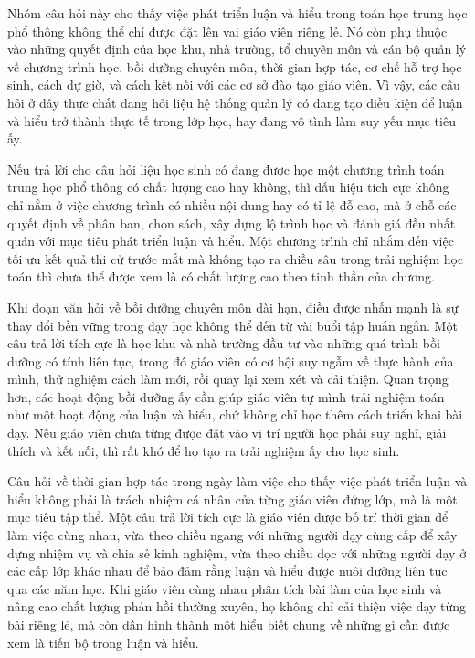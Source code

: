 \documentclass[
  10pt,
  a4paper,
  landscape,
  twoside,
  openany
]{scrbook}
\newcommand{\NOTE}[1]{#1}
\begin{document}
{
\NOTE{Nhóm câu hỏi này cho thấy việc phát triển luận và hiểu trong toán học trung học phổ thông không thể chỉ được đặt lên vai giáo viên riêng lẻ. Nó còn phụ thuộc vào những quyết định của học khu, nhà trường, tổ chuyên môn và cán bộ quản lý về chương trình học, bồi dưỡng chuyên môn, thời gian hợp tác, cơ chế hỗ trợ học sinh, cách dự giờ, và cách kết nối với các cơ sở đào tạo giáo viên. Vì vậy, các câu hỏi ở đây thực chất đang hỏi liệu hệ thống quản lý có đang tạo điều kiện để luận và hiểu trở thành thực tế trong lớp học, hay đang vô tình làm suy yếu mục tiêu ấy.

Nếu trả lời cho câu hỏi liệu học sinh có đang được học một chương trình toán trung học phổ thông có chất lượng cao hay không, thì dấu hiệu tích cực không chỉ nằm ở việc chương trình có nhiều nội dung hay có tỉ lệ đỗ cao, mà ở chỗ các quyết định về phân ban, chọn sách, xây dựng lộ trình học và đánh giá đều nhất quán với mục tiêu phát triển luận và hiểu. Một chương trình chỉ nhắm đến việc tối ưu kết quả thi cử trước mắt mà không tạo ra chiều sâu trong trải nghiệm học toán thì chưa thể được xem là có chất lượng cao theo tinh thần của chương.

Khi đoạn văn hỏi về bồi dưỡng chuyên môn dài hạn, điều được nhấn mạnh là sự thay đổi bền vững trong dạy học không thể đến từ vài buổi tập huấn ngắn. Một câu trả lời tích cực là học khu và nhà trường đầu tư vào những quá trình bồi dưỡng có tính liên tục, trong đó giáo viên có cơ hội suy ngẫm về thực hành của mình, thử nghiệm cách làm mới, rồi quay lại xem xét và cải thiện. Quan trọng hơn, các hoạt động bồi dưỡng ấy cần giúp giáo viên tự mình trải nghiệm toán như một hoạt động của luận và hiểu, chứ không chỉ học thêm cách triển khai bài dạy. Nếu giáo viên chưa từng được đặt vào vị trí người học phải suy nghĩ, giải thích và kết nối, thì rất khó để họ tạo ra trải nghiệm ấy cho học sinh.

Câu hỏi về thời gian hợp tác trong ngày làm việc cho thấy việc phát triển luận và hiểu không phải là trách nhiệm cá nhân của từng giáo viên đứng lớp, mà là một mục tiêu tập thể. Một câu trả lời tích cực là giáo viên được bố trí thời gian để làm việc cùng nhau, vừa theo chiều ngang với những người dạy cùng cấp để xây dựng nhiệm vụ và chia sẻ kinh nghiệm, vừa theo chiều dọc với những người dạy ở các cấp lớp khác nhau để bảo đảm rằng luận và hiểu được nuôi dưỡng liên tục qua các năm học. Khi giáo viên cùng nhau phân tích bài làm của học sinh và nâng cao chất lượng phản hồi thường xuyên, họ không chỉ cải thiện việc dạy từng bài riêng lẻ, mà còn dần hình thành một hiểu biết chung về những gì cần được xem là tiến bộ trong luận và hiểu.

}}
\end{document}
